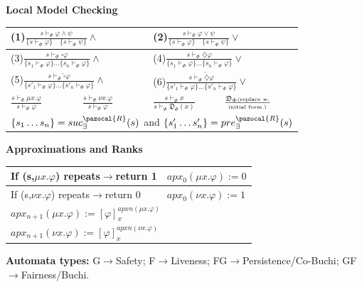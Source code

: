 \documentclass{article}
\newcommand{\Rb}{\pazocal{R}}
\newcommand{\Db}{\mathfrak{D}}
\begin{document}
\begin{multicols}{4}
\textbf{Local Model Checking}
\begin{tabular}{|l|l|l|l|}
\hline
\multicolumn{2}{|l|}{\tiny(1)\small$\frac{s \vdash_{\Phi} \varphi \wedge \psi}{\{s \vdash_{\Phi} \varphi \} \quad \{s \vdash_{\Phi} \psi\}} \wedge$} & \multicolumn{2}{|l|}{\tiny(2)\small$\frac{s \vdash_{\Phi} \varphi \vee \psi}{\{s \vdash_{\Phi} \varphi \} \quad \{s \vdash_{\Phi} \psi\}} \vee $}\\ \hline
\multicolumn{2}{|l|}{\tiny(3)\small$\frac{s \vdash_{\Phi} \square \varphi}{\{s_1 \vdash_{\Phi} \varphi\} \dots \{s_n \vdash_{\Phi} \varphi\}} \wedge$}&\multicolumn{2}{|l|}{\tiny(4)\small$\frac{s \vdash_{\Phi} \diamondsuit \varphi}{\{s_1 \vdash_{\Phi} \varphi\} \dots \{s_n \vdash_{\Phi} \varphi\}} \vee$} \\
 \hline
\multicolumn{2}{|l|}{\tiny(5)\small$\frac{s \vdash_{\Phi} \overleftarrow{\square} \varphi}{\{s'_1 \vdash_{\Phi} \varphi \}\dots \{ s'_n \vdash_{\Phi} \varphi\}} \wedge$} &\multicolumn{2}{|l|}{\tiny(6)\small$\frac{s \vdash_{\Phi} \overleftarrow{\diamondsuit} \varphi}{\{s'_1 \vdash_{\Phi} \varphi \}\dots \{ s'_n \vdash_{\Phi} \varphi\}} \vee$} \\
 \hline
$\frac{s \vdash_{\Phi} \mu x.\varphi}{s \vdash_{\Phi} \varphi}$ &$\frac{s \vdash_{\Phi} \nu x.\varphi}{s \vdash_{\Phi} \varphi}$&$\frac{s \vdash_{\Phi} x}{s \vdash_{\Phi} \Db_{\Phi}(x)}$&$\frac{\Db_{\Phi}\text{\tiny (replace w.}}{\text{\tiny initial form.)}}$\\
 \hline
\multicolumn{4}{|l|}{$\{s_1 \dots s_n \}=suc^{\Rb}_{\exists}({s})$ and $\{s'_1 \dots s'_n \}=pre^{\Rb}_{\exists}({s})$}\\ \hline 
\end{tabular}
\textbf{Approximations and Ranks}
\begin{tabular}{|l|l|}
\hline
If (s,$\mu x.\varphi$) repeats$\rightarrow$return 1&$apx_0(\mu x.\varphi):=0$\\ \hline
If (s,$\nu x.\varphi$) repeats$\rightarrow$return 0& $apx_0(\nu x.\varphi):=1$\\ \hline
\multicolumn{2}{|l|}{$apx_{n+1}(\mu x.\varphi):=[\varphi]_{x}^{apx{n}(\mu x.\varphi)}$}\\ \hline
\multicolumn{2}{|l|}{$apx_{n+1}(\nu x.\varphi):=[\varphi]_{x}^{apx{n}(\nu x.\varphi)}$}\\ \hline
\end{tabular}
\textbf{Automata types:} G$\rightarrow$Safety; F$\rightarrow$Liveness; FG$\rightarrow$Persistence/Co-Buchi; GF$\rightarrow$Fairness/Buchi.


\end{multicols}
\end{document}
